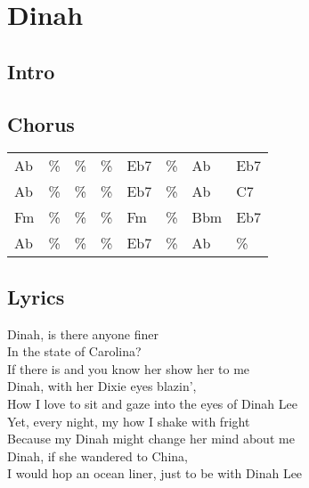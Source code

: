 \section{Dinah}


\subsection*{Intro}


\subsection*{Chorus}


\begin{tabular}{l l l l l l l l}
Ab & \% & \% & \% & Eb7 & \% & Ab & Eb7 \\ 
Ab & \% & \% & \% & Eb7 & \% & Ab & C7 \\ 
Fm & \% & \% & \% & Fm & \% & Bbm & Eb7 \\ 
Ab & \% & \% & \% & Eb7 & \% & Ab & \% \\ 
\end{tabular}


\subsection*{Lyrics}


Dinah, is there anyone finer \\ 
In the state of Carolina? \\ 
If there is and you know her show her to me \\ 

Dinah, with her Dixie eyes blazin', \\ 
How I love to sit and gaze into the eyes of Dinah Lee \\ 

Yet, every night, my how I shake with fright \\ 
Because my Dinah might change her mind about me \\ 

Dinah, if she wandered to China, \\ 
I would hop an ocean liner, just to be with Dinah Lee \\ 
